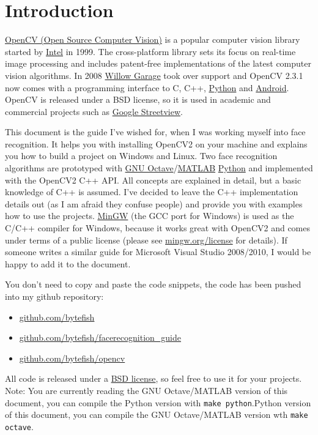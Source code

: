 \section{Introduction}

\href{http://opencv.willowgarage.com}{OpenCV (Open Source Computer Vision)} is a popular computer vision library started by \href{http://www.intel.com}{Intel} in 1999. The cross-platform library sets its focus on real-time image processing and includes patent-free implementations of the latest computer vision algorithms. In 2008 \href{http://www.willowgarage.com}{Willow Garage} took over support and OpenCV 2.3.1 now comes with a programming interface to C, C++, \href{http://www.python.org}{Python} and \href{http://www.android.com}{Android}. OpenCV is released under a BSD license, so it is used in academic and commercial projects such as \href{http://www.google.com/streetview}{Google Streetview}.

This document is the guide I've wished for, when I was working myself into face recognition. It helps you with installing OpenCV2 on your machine and explains you how to build a project on Windows and Linux. Two face recognition algorithms are prototyped with \ifx\python\undefined \href{http://www.gnu.org/software/octave/}{GNU Octave}/\href{http://www.mathworks.com}{MATLAB} \else \href{http://www.python.org}{Python}\fi{} and implemented with the OpenCV2 C++ API. All concepts are explained in detail, but a basic knowledge of C++ is assumed. I've decided to leave the C++ implementation details out (as I am afraid they confuse people) and provide you with examples how to use the projects. \href{http://www.mingw.org}{MinGW} (the GCC port for Windows) is used as the C/C++ compiler for Windows, because it works great with OpenCV2 and comes under terms of a public license (please see \href{http://www.mingw.org/license}{mingw.org/license} for details). If someone writes a similar guide for Microsoft Visual Studio 2008/2010, I would be happy to add it to the document.

You don't need to copy and paste the code snippets, the code has been pushed into my github repository:

\begin{itemize}
  \item \href{http://www.github.com/bytefish}{github.com/bytefish}
  \item \href{http://www.github.com/bytefish/facerecognition_guide}{github.com/bytefish/facerecognition\_guide}
  \item \href{http://www.github.com/bytefish/opencv}{github.com/bytefish/opencv}
\end{itemize}

All code is released under a \href{http://www.opensource.org/licenses/bsd-license}{BSD license}, so feel free to use it for your projects. Note: You are currently reading the \ifx\python\undefined GNU Octave/MATLAB version of this document, you can compile the Python version with \lstinline|make python|.\else Python version of this document, you can compile the GNU Octave/MATLAB version wth \lstinline|make octave|.\fi
		
	
